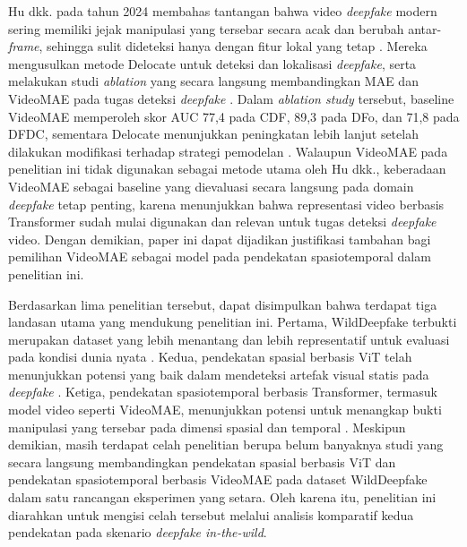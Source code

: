 Hu dkk. pada tahun 2024 membahas tantangan bahwa video \textit{deepfake} modern sering memiliki jejak manipulasi yang tersebar secara acak dan berubah antar-\textit{frame}, sehingga sulit dideteksi hanya dengan fitur lokal yang tetap \cite{hu2024delocatedetectionlocalizationdeepfake}. Mereka mengusulkan metode Delocate untuk deteksi dan lokalisasi \textit{deepfake}, serta melakukan studi \textit{ablation} yang secara langsung membandingkan MAE dan VideoMAE pada tugas deteksi \textit{deepfake} \cite{hu2024delocatedetectionlocalizationdeepfake}. Dalam \textit{ablation study} tersebut, baseline VideoMAE memperoleh skor AUC 77,4 pada CDF, 89,3 pada DFo, dan 71,8 pada DFDC, sementara Delocate menunjukkan peningkatan lebih lanjut setelah dilakukan modifikasi terhadap strategi pemodelan \cite{hu2024delocatedetectionlocalizationdeepfake}. Walaupun VideoMAE pada penelitian ini tidak digunakan sebagai metode utama oleh Hu dkk., keberadaan VideoMAE sebagai baseline yang dievaluasi secara langsung pada domain \textit{deepfake} tetap penting, karena menunjukkan bahwa representasi video berbasis Transformer sudah mulai digunakan dan relevan untuk tugas deteksi \textit{deepfake} video. Dengan demikian, paper ini dapat dijadikan justifikasi tambahan bagi pemilihan VideoMAE sebagai model pada pendekatan spasiotemporal dalam penelitian ini. \par

Berdasarkan lima penelitian tersebut, dapat disimpulkan bahwa terdapat tiga landasan utama yang mendukung penelitian ini. Pertama, WildDeepfake terbukti merupakan dataset yang lebih menantang dan lebih representatif untuk evaluasi pada kondisi dunia nyata \cite{Zi2024}. Kedua, pendekatan spasial berbasis ViT telah menunjukkan potensi yang baik dalam mendeteksi artefak visual statis pada \textit{deepfake} \cite{app12062953,zhuang2022uiavitunsupervisedinconsistencyawaremethod}. Ketiga, pendekatan spasiotemporal berbasis Transformer, termasuk model video seperti VideoMAE, menunjukkan potensi untuk menangkap bukti manipulasi yang tersebar pada dimensi spasial dan temporal \cite{KINGRA2024301817,hu2024delocatedetectionlocalizationdeepfake}. Meskipun demikian, masih terdapat celah penelitian berupa belum banyaknya studi yang secara langsung membandingkan pendekatan spasial berbasis ViT dan pendekatan spasiotemporal berbasis VideoMAE pada dataset WildDeepfake dalam satu rancangan eksperimen yang setara. Oleh karena itu, penelitian ini diarahkan untuk mengisi celah tersebut melalui analisis komparatif kedua pendekatan pada skenario \textit{deepfake in-the-wild}. \par

